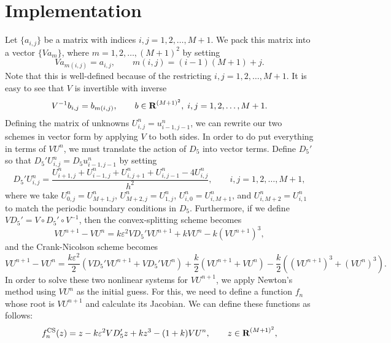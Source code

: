 \documentclass{article}
\begin{document}
	\section{Implementation}
	Let $\{a_{i,j}\}$ be a matrix with indices $i,j=1,2,\dots, M+1$. We pack this matrix into a vector $\{Va_m\}$, where $m = 1,2,\dots, (M+1)^2$ by setting
	\begin{equation}
		\label{eq:V}
		Va_{m(i,j)} = a_{i,j}, \qquad  m(i,j) = (i-1)(M+1)+j.
	\end{equation}
	Note that this is well-defined because of the restricting $i,j=1,2,\dots, M+1$. It is easy to see that $V$ is invertible with inverse
	\begin{equation}
		\label{eq:V_inv}
		V^{-1}b_{i,j} = b_{m(i,j)}, \qquad b \in \textnormal{\bf R}^{(M+1)^2}, \; i,j=1,2,\dots, M+1.
	\end{equation}
	Defining the matrix of unknowns $U^n_{i,j} = u^n_{i-1,j-1}$, we can rewrite our two schemes in vector form by applying $V$ to both sides. In order to do put everything in terms of $VU^n$, we must translate the action of $D_5$ into vector terms. Define $D_5'$ so that $D_5'U^n_{i,j} = D_5u^n_{i-1,j-1}$ by setting
	\begin{equation}
		D_5'U^n_{i,j} = \frac{U^n_{i+1,j} + U^n_{i-1,j} + U^n_{i,j+1} + U^n_{i,j-1} - 4U^n_{i,j}}{h^2}, \qquad i,j =1,2,\dots, M+1,
	\end{equation}
	where we take $U^n_{0,j} = U^n_{M+1,j}$, $U^n_{M+2,j} = U^n_{1,j}$, $U^n_{i,0} = U^n_{i,M+1}$, and $U^n_{i,M+2} = U^n_{i,1}$ to match the periodic boundary conditions in $D_5$. Furthermore, if we define $VD_5' = V\circ D_5' \circ V^{-1}$, then the convex-splitting scheme becomes
	\begin{equation*}
		VU^{n+1} - VU^n = k\varepsilon^2VD_5'VU^{n+1} + kVU^n - k(VU^{n+1})^3,
	\end{equation*}
	and the Crank-Nicolson scheme becomes
	\begin{equation*}
		VU^{n+1} - VU^n = \frac{k\varepsilon^2}{2}\left(VD_5'VU^{n+1} + VD_5'VU^n\right) + \frac{k}{2}\left(VU^{n+1} + VU^n\right) - \frac{k}{2}\left((VU^{n+1})^3 + (VU^n)^3\right).
	\end{equation*}
	In order to solve these two nonlinear systems for $VU^{n+1}$, we apply Newton's method using $VU^n$ as the initial guess. For this, we need to define a function $f_n$ whose root is $VU^{n+1}$ and calculate its Jacobian. We can define these functions as follows:
	\begin{equation*}
		f^\text{CS}_n(z) = z - k\varepsilon^2VD_5'z + kz^3 - (1+k)VU^n,  \qquad z \in \textnormal{\bf R}^{(M+1)^2},
	\end{equation*}
\end{document}
